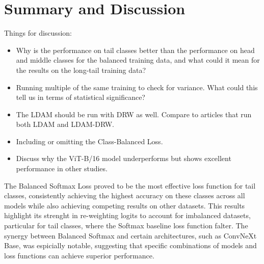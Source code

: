 


\section{Summary and Discussion}
Things for discussion:

\begin{itemize}
    \item Why is the performance on tail classes better than the performance on head and middle classes for the balanced training data, and what could it mean for the results on the long-tail training data?
    \item Running multiple of the same training to check for variance. What could this tell us in terms of statistical significance?
    \item The LDAM should be run with DRW as well. Compare to articles that run both LDAM and LDAM-DRW.
    \item Including or omitting the Class-Balanced Loss.
    \item Discuss why the ViT-B/16 model underperforms but shows excellent performance in other studies.
\end{itemize}


The Balanced Softmax Loss proved to be the most effective loss function for tail classes, consistently achieving the highest accuracy on these classes across all models while also achieving competing results on other datasets. This results highlight its strenght in re-weighting logits to account for imbalanced datasets, particular for tail classes, where the Softmax baseline loss function falter. The synergy between Balanced Softmax and certain architectures, such as ConvNeXt Base, was espicially notable, suggesting that specific combinations of models and loss functions can achieve superior performance.

